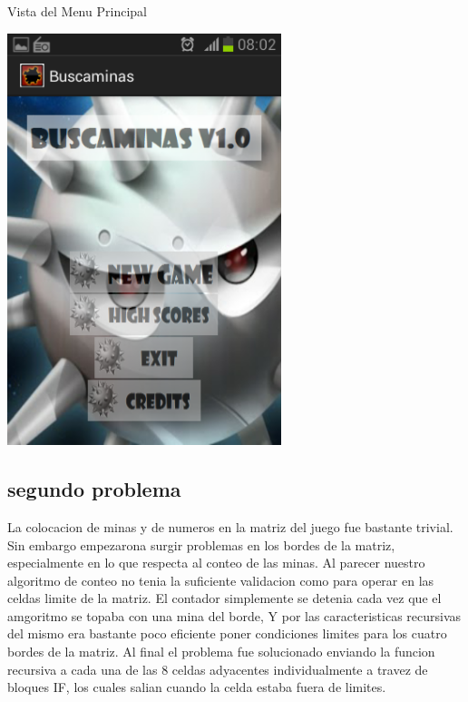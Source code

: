 \documentclass[11pt]{article} %
\begin{document}
\begin{center}
Vista del Menu Principal

\includegraphics[width=8cm]{imagenes/Screenshot_2013-12-11-08-02-16.png}
\end{center}

\subsection{segundo problema}

La colocacion de minas y de numeros en la matriz del juego fue bastante trivial. Sin embargo empezarona  surgir problemas en los bordes de la matriz, especialmente en lo que respecta al conteo de las minas.
Al parecer nuestro algoritmo de conteo no tenia la suficiente validacion como para operar en las celdas limite de la matriz. El contador simplemente se detenia cada vez que el amgoritmo se topaba con una mina del borde, Y por las caracteristicas recursivas del mismo era bastante poco eficiente poner condiciones limites para los cuatro bordes de la matriz. Al final el problema fue solucionado enviando la funcion recursiva a cada una de las 8 celdas adyacentes individualmente a travez de bloques IF, los cuales salian cuando la celda estaba fuera de limites.
\end{document}
